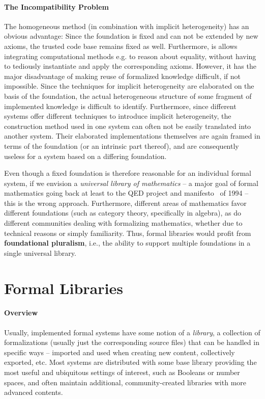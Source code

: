 \paragraph*{The Incompatibility Problem} The homogeneous method (in combination with implicit heterogeneity) has an obvious advantage: Since the foundation is fixed and can not be extended by new axioms, the trusted code base remains fixed as well. Furthermore, is allows integrating computational methods e.g. to reason about equality, without having to tediously instantiate and apply the corresponding axioms. However, it has the major disadvantage of making reuse of formalized knowledge difficult, if not impossible. Since the techniques for implicit heterogeneity are elaborated on the basis of the foundation, the actual heterogeneous structure of some fragment of implemented knowledge is difficult to identify. Furthermore, since different systems offer different techniques to introduce implicit heterogeneity, the construction method used in one system can often not be easily translated into another system. Their elaborated implementations themselves are again framed in terms of the foundation (or an intrinsic part thereof), and are consequently useless for a system based on a differing foundation.

Even though a fixed foundation is therefore reasonable for an individual formal system, if we envision a \emph{universal library of mathematics}  -- a major goal of formal mathematics going back at least to the QED project and
manifesto~\cite{qed} of 1994 -- this is the wrong approach. Furthermore, different areas of mathematics favor different foundations (such as category theory, specifically in algebra), as do different communities dealing with formalizing mathematics, whether due to technical reasons or simply familiarity. Thus, formal libraries would profit from \textbf{foundational pluralism}, i.e., the ability to support multiple foundations in a single universal library.

\section{Formal Libraries}\label{sec:libraries} 

\paragraph*{Overview} Usually, implemented formal systems have some notion of a \emph{library}, a collection of formalizations (usually just the corresponding source files) that can be handled in specific ways -- imported and used when creating new content, collectively exported, etc. Most systems are distributed with some base library providing the most useful and ubiquitous settings of interest, such as Booleans or number spaces, and often maintain additional, community-created libraries with more advanced contents.

